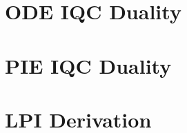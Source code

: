 \documentclass[journal,10pt,twoside,a4paper]{IEEEtran}
\begin{document}
\maketitle


\section{ODE IQC Duality}

\section{PIE IQC Duality}

\section{LPI Derivation}







  
\vspace{12pt}
\end{document}
